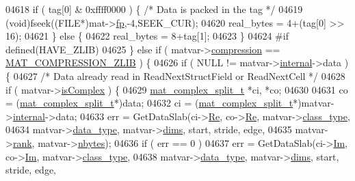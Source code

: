 \begin{DoxyCode}
{{{{{{{{{{{{{{{{{{{{{{{{{04618         \textcolor{keywordflow}{if} ( tag[0] & 0xffff0000 ) \{ \textcolor{comment}{/* Data is packed in the tag */}
04619             (void)fseek((FILE*)mat->\hyperlink{struct__mat__t_a85f562e407ca9ad4d2a6e14f839432b7}{fp},-4,SEEK\_CUR);
04620             real\_bytes = 4+(tag[0] >> 16);
04621         \} \textcolor{keywordflow}{else} \{
04622             real\_bytes = 8+tag[1];
04623         \}
04624 \textcolor{preprocessor}{#if defined(HAVE\_ZLIB)}
04625     \} \textcolor{keywordflow}{else} \textcolor{keywordflow}{if} ( matvar->\hyperlink{group___m_a_t_aeef0466048621cb2c959ba7f6c774d06}{compression} == \hyperlink{group___m_a_t_gga768c318af97bd2567758ecb001ceb7f4a5181d2f71eab0f12f05ba65d4f13fb53}{MAT\_COMPRESSION\_ZLIB} ) \{
04626         \textcolor{keywordflow}{if} ( NULL != matvar->\hyperlink{group___m_a_t_a6e97e3ed9f40c49322c18561c2a94e92}{internal}->data ) \{
04627             \textcolor{comment}{/* Data already read in ReadNextStructField or ReadNextCell */}
04628             \textcolor{keywordflow}{if} ( matvar->\hyperlink{group___m_a_t_aeb03b3a69f108dc05470b00443a43739}{isComplex} ) \{
04629                 \hyperlink{group___m_a_t_structmat__complex__split__t}{mat\_complex\_split\_t} *ci, *co;
04630 
04631                 co = (\hyperlink{group___m_a_t_structmat__complex__split__t}{mat\_complex\_split\_t}*)data;
04632                 ci = (\hyperlink{group___m_a_t_structmat__complex__split__t}{mat\_complex\_split\_t}*)matvar->\hyperlink{group___m_a_t_a6e97e3ed9f40c49322c18561c2a94e92}{internal}->data;
04633                 err = GetDataSlab(ci->\hyperlink{group___m_a_t_a484a93607508adac2bce53a0252e0325}{Re}, co->\hyperlink{group___m_a_t_a484a93607508adac2bce53a0252e0325}{Re}, matvar->\hyperlink{group___m_a_t_aff13035bf3265dd7d9425e5d40c839d4}{class\_type},
04634                     matvar->\hyperlink{group___m_a_t_ab6aafe9bd77f0f077852593dec438144}{data\_type}, matvar->\hyperlink{group___m_a_t_a8e01234e1c862ce3472bb37f5a09b92c}{dims}, start, stride, edge,
04635                     matvar->\hyperlink{group___m_a_t_a84ba70c96ded13cc555fa75b768d9921}{rank}, matvar->\hyperlink{group___m_a_t_abf1c844540503be2df9bb3db93cfe307}{nbytes});
04636                 \textcolor{keywordflow}{if} ( err == 0 )
04637                     err = GetDataSlab(ci->\hyperlink{group___m_a_t_a7182d10b0d3598415887376065440946}{Im}, co->\hyperlink{group___m_a_t_a7182d10b0d3598415887376065440946}{Im}, matvar->\hyperlink{group___m_a_t_aff13035bf3265dd7d9425e5d40c839d4}{class\_type},
04638                         matvar->\hyperlink{group___m_a_t_ab6aafe9bd77f0f077852593dec438144}{data\_type}, matvar->\hyperlink{group___m_a_t_a8e01234e1c862ce3472bb37f5a09b92c}{dims}, start, stride, edge,
}}}}}}}}}}}}}}}}}}}}}}}}}
\end{DoxyCode}
